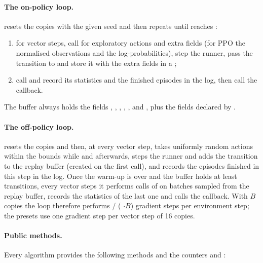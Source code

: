\paragraph{The on-policy loop.}  resets the
copies with the given seed and then repeats until  reaches
:
\begin{enumerate}
  \item for  vector steps, call
     for exploratory actions and extra fields (for
    PPO the normalised observations and the log-probabilities), step the
    runner, pass the transition to  and store it
    with the extra fields in a ;
  \item call  and record its statistics and the
    finished episodes in the log, then call the callback.
\end{enumerate}
The buffer always holds the fields , , ,
, ,  and
, plus the fields declared by .

\paragraph{The off-policy loop.}  resets the
copies and then, at every vector step, takes uniformly random actions within
the bounds while  and 
afterwards, steps the runner and adds the transition to the replay buffer
(created on the first call), and records the episodes finished in this step
in the log. Once the warm-up is over and the buffer holds at least
 transitions, every  vector steps it
performs  calls of  on batches
sampled from the replay buffer, records the statistics of the last one and
calls the callback. With $B$ copies the loop therefore performs
 / ( $\cdot B$) gradient steps per
environment step; the presets use one gradient step per vector step of 16
copies.

\paragraph{Public methods.} Every algorithm provides the following methods
and the counters  and :

